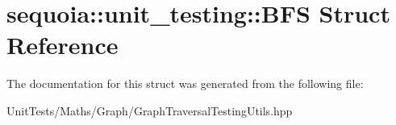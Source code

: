 \hypertarget{structsequoia_1_1unit__testing_1_1_b_f_s}{}\section{sequoia\+::unit\+\_\+testing\+::B\+FS Struct Reference}
\label{structsequoia_1_1unit__testing_1_1_b_f_s}


The documentation for this struct was generated from the following file\+:\begin{DoxyCompactItemize}
\item 
Unit\+Tests/\+Maths/\+Graph/Graph\+Traversal\+Testing\+Utils.\+hpp\end{DoxyCompactItemize}
